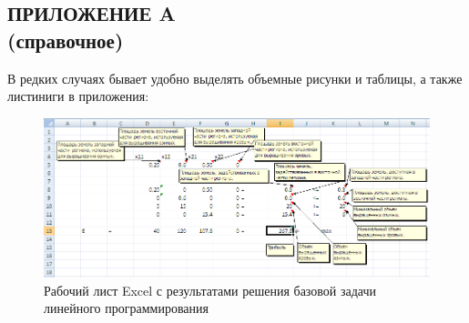 \begin{landscape}
\section*{ПРИЛОЖЕНИЕ A \\ (справочное)}

В редких случаях бывает удобно выделять объемные рисунки и таблицы, а также листиниги в приложения:
  
\begin{figure}[h]
\centering
  \includegraphics[width=1\linewidth]{pic/excel}
  \caption{Рабочий лист Excel с результатами решения базовой задачи линейного программирования}
\end{figure}

\end{landscape}

\newpage
